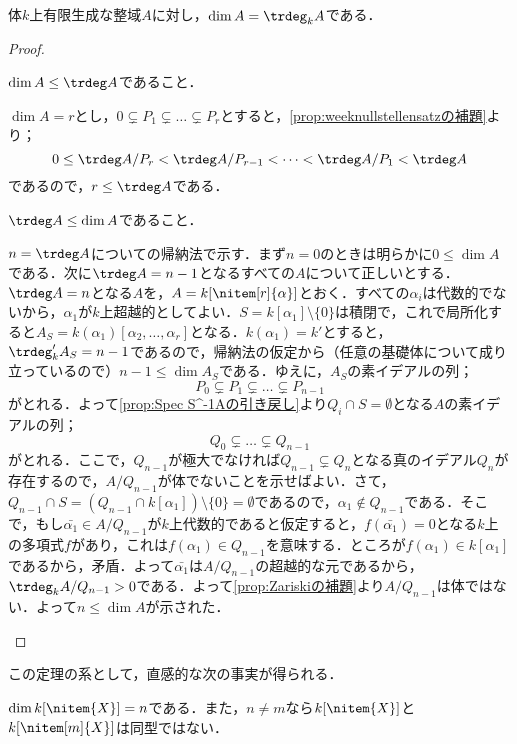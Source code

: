 \begin{thm}
	体$k$上有限生成な整域$A$に対し，$\dim A=\trdeg_k A$である．
\end{thm}
\begin{proof}
	\begin{step}
		\item $\dim A\leq\trdeg A$であること．
		
		$\dim A=r$とし，$0\subsetneq P _1\subsetneq\dots\subsetneq P _r$とすると，\ref{prop:weeknullstellensatzの補題}より；
		\[0\leq\trdeg A/ P _r<\trdeg A/ P _{r-1}<\dots<\trdeg A/ P _1<\trdeg A\]
		であるので，$r\leq\trdeg A$である．
		
		\item $\trdeg A\leq\dim A$であること．
		
		$n=\trdeg A$についての帰納法で示す．まず$n=0$のときは明らかに$0\leq\dim A$である．次に$\trdeg A=n-1$となるすべての$A$について正しいとする．$\trdeg A=n$となる$A$を，$A=k[\nitem[r]{\alpha}]$とおく．すべての$\alpha_i$は代数的でないから，$\alpha_1$が$k$上超越的としてよい．$S=k[\alpha_1]\setminus\{0\}$は積閉で，これで局所化すると$A_S=k(\alpha_1)[\alpha_2,\dots,\alpha_r]$となる．$k(\alpha_1)=k'$とすると，$\trdeg_k' A_S=n-1$であるので，帰納法の仮定から（任意の基礎体について成り立っているので）$n-1\leq\dim A_S$である．ゆえに，$A_S$の素イデアルの列；
		\[ P _0\subsetneq P _1\subsetneq\dots\subsetneq P _{n-1}\]
		がとれる．よって\ref{prop:Spec S^-1Aの引き戻し}より$ Q _i\cap S=\emptyset$となる$A$の素イデアルの列；
		\[ Q _0\subsetneq\dots\subsetneq Q _{n-1}\]
		がとれる．ここで，$ Q _{n-1}$が極大でなければ$ Q _{n-1}\subsetneq Q _n$となる真のイデアル$ Q _n$が存在するので，$A/ Q _{n-1}$が体でないことを示せばよい．さて，$ Q _{n-1}\cap S=( Q _{n-1}\cap k[\alpha_1])\setminus\{0\}=\emptyset$であるので，$\alpha_1\not\in Q _{n-1}$である．そこで，もし$\bar{\alpha_1}\in A/ Q _{n-1}$が$k$上代数的であると仮定すると，$f(\bar{\alpha_1})=0$となる$k$上の多項式$f$があり，これは$f(\alpha_1)\in Q _{n-1}$を意味する．ところが$f(\alpha_1)\in k[\alpha_1]$であるから，矛盾．よって$\bar{\alpha_1}$は$A/ Q _{n-1}$の超越的な元であるから，$\trdeg_k A/ Q _{n-1}>0$である．よって\ref{prop:Zariskiの補題}より$A/ Q _{n-1}$は体ではない．よって$n\leq\dim A$が示された．
	\end{step}
\end{proof}

この定理の系として，直感的な次の事実が得られる．
\begin{cor}\label{cor:多項式環の次元}
	$\dim k[\nitem{X}]=n$である．また，$n\neq m$なら$k[\nitem{X}]$と$k[\nitem[m]{X}]$は同型ではない．
\end{cor}

